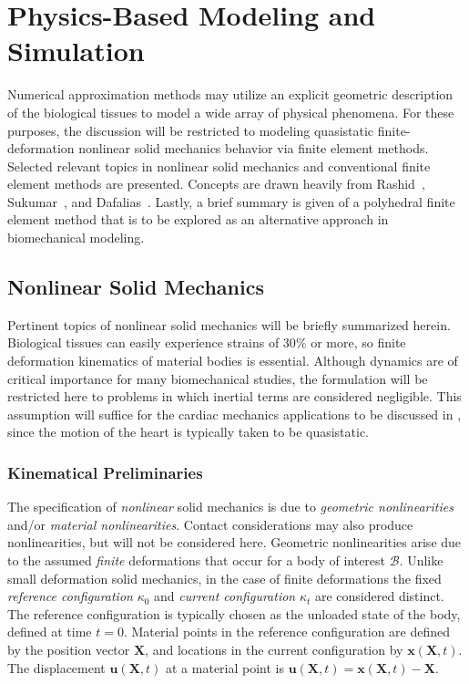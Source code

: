 \chapter{Physics-Based Modeling and Simulation}
\label{chap:4}
%

Numerical approximation methods may utilize an explicit geometric description of the biological tissues to model a wide array of physical phenomena. For these purposes, the discussion will be restricted to modeling quasistatic finite-deformation nonlinear solid mechanics behavior via finite element methods. Selected relevant topics in nonlinear solid mechanics and conventional finite element methods are presented. Concepts are drawn heavily from Rashid~\cite{rashid_2017, rashid_289, rashid_212, rashid_201}, Sukumar~\cite{suku_212}, and Dafalias~\cite{dafalias_205}. Lastly, a brief summary is given of a polyhedral finite element method that is to be explored as an alternative approach in biomechanical modeling.

\section{Nonlinear Solid Mechanics}
\label{Nonlinear Solid Mechanics}

Pertinent topics of nonlinear solid mechanics will be briefly summarized herein. Biological tissues can easily experience strains of 30$\%$ or more, so finite deformation kinematics of material bodies is essential. Although dynamics are of critical importance for many biomechanical studies, the formulation will be restricted here to problems in which inertial terms are considered negligible. This assumption will suffice for the cardiac mechanics applications to be discussed in , since the motion of the heart is typically taken to be quasistatic.

\subsection{Kinematical Preliminaries}

The specification of \textit{nonlinear} solid mechanics is due to \textit{geometric nonlinearities} and/or \textit{material nonlinearities}. Contact considerations may also produce nonlinearities, but will not be considered here. Geometric nonlinearities arise due to the assumed \textit{finite} deformations that occur for a body of interest $\mathcal{B}$. Unlike small deformation solid mechanics, in the case of finite deformations the fixed \textit{reference configuration} $\kappa_0$ and \textit{current configuration} $\kappa_t$ are considered distinct. The reference configuration is typically chosen as the unloaded state of the body, defined at time $t=0$. Material points in the reference configuration are defined by the position vector $\bm{X}$, and locations in the current configuration by $\bm{x}(\bm{X},t)$. The displacement $\bm{u}(\bm{X},t)$ at a material point is $\bm{u}(\bm{X},t) = \bm{x}(\bm{X},t) - \bm{X}$.

